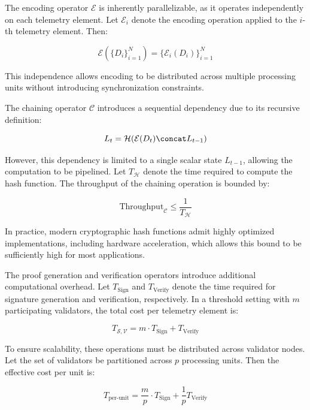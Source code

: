 The encoding operator $\mathcal{E}$ is inherently parallelizable, as it operates independently on each telemetry element. Let $\mathcal{E}_i$ denote the encoding operation applied to the $i$-th telemetry element. Then:

\begin{equation}
\mathcal{E}(\{D_i\}_{i=1}^{N}) = \{\mathcal{E}_i(D_i)\}_{i=1}^{N}
\end{equation}

This independence allows encoding to be distributed across multiple processing units without introducing synchronization constraints.

The chaining operator $\mathcal{C}$ introduces a sequential dependency due to its recursive definition:

\begin{equation}
L_t = \mathcal{H}(\mathcal{E}(D_t) \concat L_{t-1})
\end{equation}

However, this dependency is limited to a single scalar state $L_{t-1}$, allowing the computation to be pipelined. Let $T_{\mathcal{H}}$ denote the time required to compute the hash function. The throughput of the chaining operation is bounded by:

\begin{equation}
\text{Throughput}_{\mathcal{C}} \leq \frac{1}{T_{\mathcal{H}}}
\end{equation}

In practice, modern cryptographic hash functions admit highly optimized implementations, including hardware acceleration, which allows this bound to be sufficiently high for most applications.

The proof generation and verification operators introduce additional computational overhead. Let $T_{\text{Sign}}$ and $T_{\text{Verify}}$ denote the time required for signature generation and verification, respectively. In a threshold setting with $m$ participating validators, the total cost per telemetry element is:

\begin{equation}
T_{\mathcal{S}, \mathcal{V}} = m \cdot T_{\text{Sign}} + T_{\text{Verify}}
\end{equation}

To ensure scalability, these operations must be distributed across validator nodes. Let the set of validators be partitioned across $p$ processing units. Then the effective cost per unit is:

\begin{equation}
T_{\text{per-unit}} = \frac{m}{p} \cdot T_{\text{Sign}} + \frac{1}{p} T_{\text{Verify}}
\end{equation}

